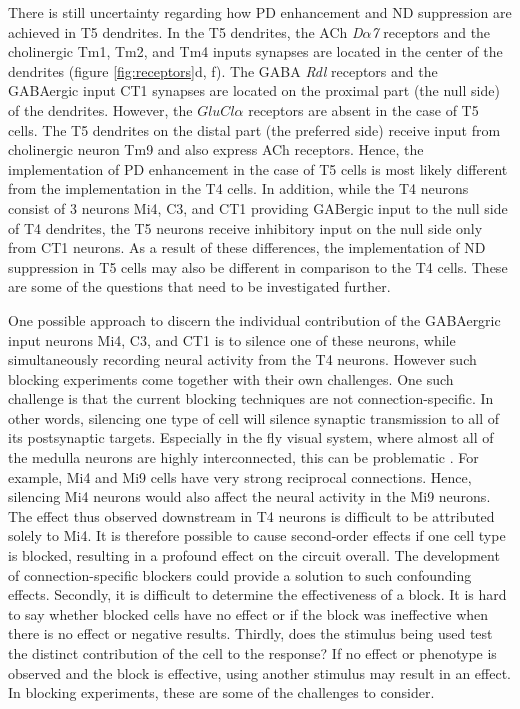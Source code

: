 There is still uncertainty regarding how PD enhancement and ND suppression are achieved in T5 dendrites. In the T5 dendrites, the ACh \textit{D$\alpha$7} receptors and the cholinergic Tm1, Tm2, and Tm4 inputs synapses are located in the center of the dendrites (figure \ref{fig:receptors}d, f). The GABA \textit{Rdl} receptors and the GABAergic input CT1 synapses are located on the proximal part (the null side) of the dendrites. However, the \textit{$GluCl\alpha$} receptors are absent in the case of T5 cells. The T5 dendrites on the distal part (the preferred side) receive input from cholinergic neuron Tm9 and also express ACh receptors. Hence, the implementation of PD enhancement in the case of T5 cells is most likely different from the implementation in the T4 cells. In addition, while the T4 neurons consist of 3 neurons Mi4, C3, and CT1 providing GABergic input to the null side of T4 dendrites, the T5 neurons receive inhibitory input on the null side only from CT1 neurons. As a result of these differences, the implementation of ND suppression in T5 cells may also be different in comparison to the T4 cells. These are some of the questions that need to be investigated further. 

One possible approach to discern the individual contribution of the GABAergric input neurons Mi4, C3, and CT1 is to silence one of these neurons, while simultaneously recording neural activity from the T4 neurons. However such blocking experiments come together with their own challenges. One such challenge is that the current blocking techniques are not connection-specific. In other words, silencing one type of cell will silence synaptic transmission to all of its postsynaptic targets. Especially in the fly visual system, where almost all of the medulla neurons are highly interconnected, this can be problematic \parencite{Takemura2017}. For example, Mi4 and Mi9 cells have very strong reciprocal connections. Hence, silencing Mi4 neurons would also affect the neural activity in the Mi9 neurons. The effect thus observed downstream in T4 neurons is difficult to be attributed solely to Mi4. It is therefore possible to cause second-order effects if one cell type is blocked, resulting in a profound effect on the circuit overall. The development of connection-specific blockers could provide a solution to such confounding effects. Secondly, it is difficult to determine the effectiveness of a block. It is hard to say whether blocked cells have no effect or if the block was ineffective when there is no effect or negative results. Thirdly, does the stimulus being used test the distinct contribution of the cell to the response? If no effect or phenotype is observed and the block is effective, using another stimulus may result in an effect. In blocking experiments, these are some of the challenges to consider.

